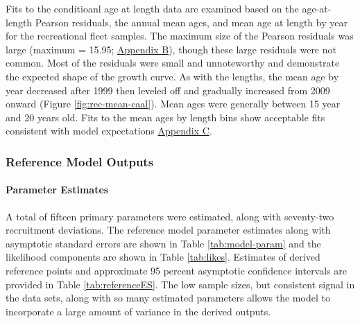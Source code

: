 \documentclass[11pt,
  english,
  a4paper,
]{article}
\begin{document}

Fits to the conditioanl age at length data are examined based on the age-at-length Pearson residuals, the annual mean ages, and mean age at length by year for the recreational fleet samples. The maximum size of the Pearson residuals was large (maximum = 15.95; {\protect\hyperlink{app_b}{Appendix B}\leavevmode\tagmcend\tagstructend}), though these large residuals were not common. Most of the residuals were small and unnoteworthy and demonstrate the expected shape of the growth curve. As with the lengths, the mean age by year decreased after 1999 then leveled off and gradually increased from 2009 onward (Figure \ref{fig:rec-mean-caal}). Mean ages were generally between 15 year and 20 years old. Fits to the mean ages by length bins show acceptable fits consistent with model expectations {\protect\hyperlink{app_c}{Appendix C}\leavevmode\tagmcend\tagstructend}.

\leavevmode\tagmcend\tagstructend\par


\hypertarget{reference-model-outputs}{%
\subsubsection{Reference Model Outputs}\label{reference-model-outputs}}

\leavevmode\tagmcend\tagstructend


\hypertarget{parameter-estimates}{%
\paragraph{Parameter Estimates}\label{parameter-estimates}}

\leavevmode\tagmcend\tagstructend


A total of fifteen primary parameters were estimated, along with seventy-two recruitment deviations. The reference model parameter estimates along with asymptotic standard errors are shown in Table \ref{tab:model-param} and the likelihood components are shown in Table \ref{tab:likes}. Estimates of derived reference points and approximate 95 percent asymptotic confidence intervals are provided in Table \ref{tab:referenceES}. The low sample sizes, but consistent signal in the data sets, along with so many estimated parameters allows the model to incorporate a large amount of variance in the derived outputs.
\end{document}
